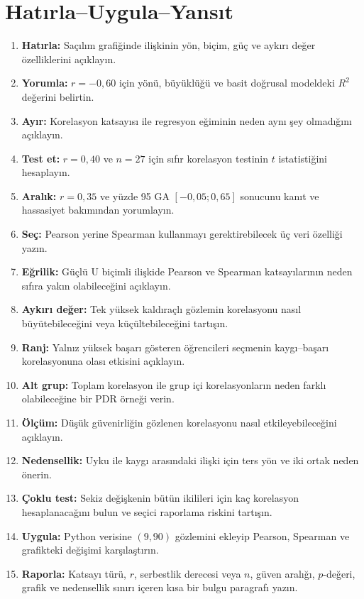 



\section*{Hatırla--Uygula--Yansıt}

\begin{enumerate}
\renewcommand{\labelenumi}{\textbf{\Alph{enumi}.}}
  \item \textbf{Hatırla:} Saçılım grafiğinde ilişkinin yön, biçim, güç ve aykırı değer özelliklerini açıklayın.
  \item \textbf{Yorumla:} $r=-0{,}60$ için yönü, büyüklüğü ve basit doğrusal modeldeki $R^2$ değerini belirtin.
  \item \textbf{Ayır:} Korelasyon katsayısı ile regresyon eğiminin neden aynı şey olmadığını açıklayın.
  \item \textbf{Test et:} $r=0{,}40$ ve $n=27$ için sıfır korelasyon testinin $t$ istatistiğini hesaplayın.
  \item \textbf{Aralık:} $r=0{,}35$ ve yüzde 95 GA $[-0{,}05;0{,}65]$ sonucunu kanıt ve hassasiyet bakımından yorumlayın.
  \item \textbf{Seç:} Pearson yerine Spearman kullanmayı gerektirebilecek üç veri özelliği yazın.
  \item \textbf{Eğrilik:} Güçlü U biçimli ilişkide Pearson ve Spearman katsayılarının neden sıfıra yakın olabileceğini açıklayın.
  \item \textbf{Aykırı değer:} Tek yüksek kaldıraçlı gözlemin korelasyonu nasıl büyütebileceğini veya küçültebileceğini tartışın.
  \item \textbf{Ranj:} Yalnız yüksek başarı gösteren öğrencileri seçmenin kaygı--başarı korelasyonuna olası etkisini açıklayın.
  \item \textbf{Alt grup:} Toplam korelasyon ile grup içi korelasyonların neden farklı olabileceğine bir PDR örneği verin.
  \item \textbf{Ölçüm:} Düşük güvenirliğin gözlenen korelasyonu nasıl etkileyebileceğini açıklayın.
  \item \textbf{Nedensellik:} Uyku ile kaygı arasındaki ilişki için ters yön ve iki ortak neden önerin.
  \item \textbf{Çoklu test:} Sekiz değişkenin bütün ikilileri için kaç korelasyon hesaplanacağını bulun ve seçici raporlama riskini tartışın.
  \item \textbf{Uygula:} Python verisine $(9,90)$ gözlemini ekleyip Pearson, Spearman ve grafikteki değişimi karşılaştırın.
  \item \textbf{Raporla:} Katsayı türü, $r$, serbestlik derecesi veya $n$, güven aralığı, $p$-değeri, grafik ve nedensellik sınırı içeren kısa bir bulgu paragrafı yazın.
\end{enumerate}

